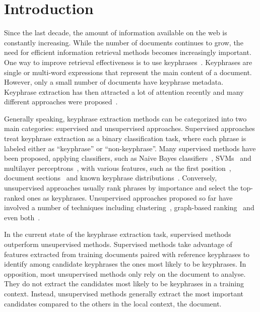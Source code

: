 \section{Introduction}
\label{sec:introduction}
  Since the last decade, the amount of information available on the web is
  constantly increasing. While the number of documents continues to grow, the
  need for efficient information retrieval methods becomes increasingly
  important. One way to improve retrieval effectiveness is to use
  keyphrases~\cite{jones1999phrasier}. Keyphrases are single or multi-word
  expressions that represent the main content of a document. However,
  only a small number of documents have keyphrase metadata. Keyphrase extraction
  has then attracted a lot of attention recently and many different approaches
  were proposed~\cite{hasan2014state_of_the_art}.

  Generally speaking, keyphrase extraction methods can be categorized into two
  main categories: supervised and unsupervised approaches. Supervised approaches
  treat keyphrase extraction as a binary classification task, where each phrase
  is labeled either as ``keyphrase'' or ``non-keyphrase''. Many supervised
  methods have been proposed, applying classifiers, such as Naive Bayes
  classifiers~\cite{witten1999kea}, SVMs~\cite{zhang2006svm} and multilayer
  perceptrons~\cite{sarkar2010neuralnetwork}, with various features, such as the
  first position~\cite{witten1999kea}, document
  sections~\cite{nguyen2007keadocumentstructure} and known keyphrase
  distributions~\cite{frank1999keafrequency}. Conversely, unsupervised
  approaches usually rank phrases by importance and select the top-ranked ones
  as keyphrases. Unsupervised approaches proposed so far have involved a number
  of techniques including clustering~\cite{liu2009keycluster}, graph-based
  ranking~\cite{mihalcea2004textrank} and even
  both~\cite{bougouin2013topicrank}.

  In the current state of the keyphrase extraction task, supervised methods
  outperform unsupervised methods. Supervised methods take advantage of features
  extracted from training documents paired with reference keyphrases to identify
  among candidate keyphrases the ones most likely to be keyphrases. In
  opposition, most unsupervised methods only rely on the document to analyse.
  They do not extract the candidates most likely to be keyphrases in a training
  context. Instead, unsupervised methods generally extract the most important
  candidates compared to the others in the local context, the document.

